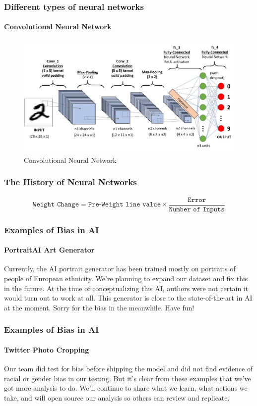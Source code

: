 \documentclass{beamer}
\begin{document}
\begin{frame}
\frametitle{Different types of neural networks}
\framesubtitle{Convolutional Neural Network}
\begin{figure}[h!]
    \includegraphics[width=\textwidth]{./assets/convolutional2.jpeg}
    \caption{Convolutional Neural Network}
    \label{fig:convolutional_neural_network}
\end{figure}
\end{frame}

\begin{frame}
\frametitle{The History of Neural Networks}
\framesubtitle{}
\begin{equation} \label{eq:Widrow-Hoff}
    \texttt{Weight Change} = \texttt{Pre-Weight line value}\times \frac{\texttt{Error}}{\texttt{Number of Inputs}}
\end{equation}
\end{frame}

\begin{frame}
\frametitle{Examples of Bias in AI}
\framesubtitle{PortraitAI Art Generator}
\begin{quoting}
    Currently, the AI portrait generator has been trained mostly on portraits of people of European ethnicity. We're planning to expand our dataset and fix this in the future. At the time of conceptualizing this AI, authors were not certain it would turn out to work at all. This generator is close to the state-of-the-art in AI at the moment. Sorry for the bias in the meanwhile. Have fun!
\end{quoting}
\end{frame}

\begin{frame}
\frametitle{Examples of Bias in AI}
\framesubtitle{Twitter Photo Cropping}
\begin{quoting}
    Our team did test for bias before shipping the model and did not find evidence of racial or gender bias in our testing. But it's clear from these examples that we've got more analysis to do. We'll continue to share what we learn, what actions we take, and will open source our analysis so others can review and replicate.
\end{quoting}
\end{frame}
\end{document}
